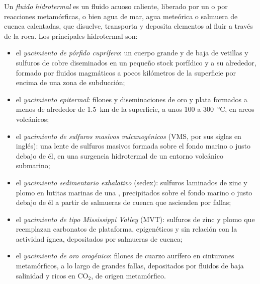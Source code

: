 \begin{definition}\label{def:b2:ore-deposits:hydrothermal}
Un \emph{fluido hidrotermal} es un fluido acuoso caliente, liberado por un 
o por reacciones metamórficas, o bien agua de mar, agua meteórica o salmuera de cuenca calentadas, que disuelve,
transporta y deposita elementos al fluir a través de la roca. Los principales  hidrotermal
son:
\begin{itemize}
  \item el \emph{yacimiento de pórfido cuprífero}: un cuerpo grande y de baja 
        de vetillas y sulfuros de cobre diseminados en un pequeño stock porfídico y a su alrededor, formado por
        fluidos magmáticos a pocos kilómetros de la superficie por encima de una zona de subducción;
  \item el \emph{yacimiento epitermal}: filones y diseminaciones de oro y plata
        formados a menos de alrededor de \qty{1.5}{km} de la superficie, a unos 100 a
        \qty{300}{\celsius}, en arcos volcánicos;
  \item el \emph{yacimiento de sulfuros masivos vulcanogénicos}
        (VMS, por sus siglas en inglés): una lente de sulfuros masivos formada sobre el fondo marino o justo debajo de él, en una
        surgencia hidrotermal de un entorno volcánico submarino;
  \item el \emph{yacimiento sedimentario exhalativo} (sedex):
        sulfuros laminados de zinc y plomo en lutitas marinas de una , precipitados sobre el fondo marino o justo
        debajo de él a partir de salmueras de cuenca que ascienden por fallas;
  \item el \emph{yacimiento de tipo Mississippi Valley} (MVT):
        sulfuros de zinc y plomo que reemplazan carbonatos de plataforma, epigenéticos y sin relación con la actividad
        ígnea, depositados por salmueras de cuenca;
  \item el \emph{yacimiento de oro orogénico}: filones de cuarzo aurífero en
        cinturones metamórficos, a lo largo de grandes fallas, depositados por fluidos de baja salinidad y ricos en CO$_2$, de
        origen metamórfico.
\end{itemize}
\end{definition}

